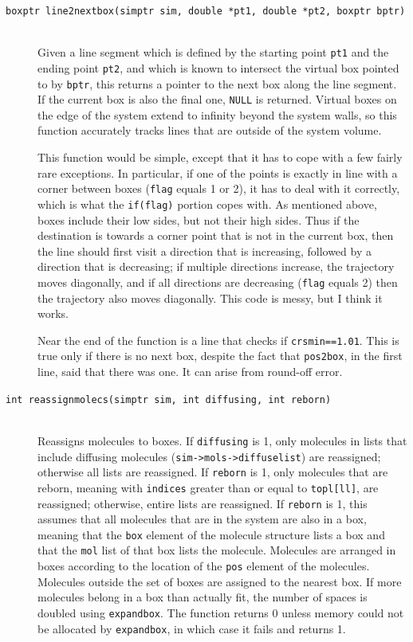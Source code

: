 \documentclass {scrbook}
\newcommand {\ttt} {\texttt}
\begin{document}
\begin{description}
\item[\ttt{boxptr line2nextbox(simptr sim, double *pt1, double *pt2, boxptr bptr)}]
\hfill \\
Given a line segment which is defined by the starting point \ttt{pt1} and the ending point \ttt{pt2}, and which is known to intersect the virtual box pointed to by \ttt{bptr}, this returns a pointer to the next box along the line segment. If the current box is also the final one, \ttt{NULL} is returned. Virtual boxes on the edge of the system extend to infinity beyond the system walls, so this function accurately tracks lines that are outside of the system volume.

This function would be simple, except that it has to cope with a few fairly rare exceptions. In particular, if one of the points is exactly in line with a corner between boxes (\ttt{flag} equals 1 or 2), it has to deal with it correctly, which is what the \ttt{if(flag)} portion copes with. As mentioned above, boxes include their low sides, but not their high sides. Thus if the destination is towards a corner point that is not in the current box, then the line should first visit a direction that is increasing, followed by a direction that is decreasing; if multiple directions increase, the trajectory moves diagonally, and if all directions are decreasing (\ttt{flag} equals 2) then the trajectory also moves diagonally. This code is messy, but I think it works.

Near the end of the function is a line that checks if \ttt{crsmin==1.01}. This is true only if there is no next box, despite the fact that \ttt{pos2box}, in the first line, said that there was one. It can arise from round-off error.

\item[\ttt{int reassignmolecs(simptr sim, int diffusing, int reborn)}]
\hfill \\
Reassigns molecules to boxes. If \ttt{diffusing} is 1, only molecules in lists that include diffusing molecules (\ttt{sim->mols->diffuselist}) are reassigned; otherwise all lists are reassigned. If \ttt{reborn} is 1, only molecules that are reborn, meaning with \ttt{indices} greater than or equal to \ttt{topl[ll]}, are reassigned; otherwise, entire lists are reassigned. If \ttt{reborn} is 1, this assumes that all molecules that are in the system are also in a box, meaning that the \ttt{box} element of the molecule structure lists a box and that the \ttt{mol} list of that box lists the molecule. Molecules are arranged in boxes according to the location of the \ttt{pos} element of the molecules. Molecules outside the set of boxes are assigned to the nearest box. If more molecules belong in a box than actually fit, the number of spaces is doubled using \ttt{expandbox}. The function returns 0 unless memory could not be allocated by \ttt{expandbox}, in which case it fails and returns 1.


\end{description}
\end{document}
